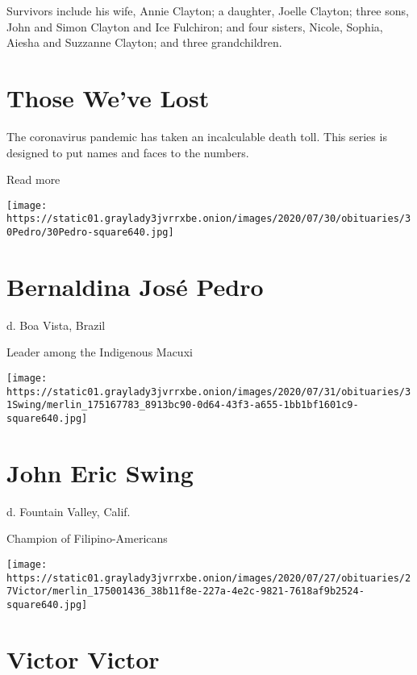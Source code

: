 Survivors include his wife, Annie Clayton; a daughter, Joelle Clayton;
three sons, John and Simon Clayton and Ice Fulchiron; and four sisters,
Nicole, Sophia, Aiesha and Suzzanne Clayton; and three grandchildren.

\href{https://www.nytimes3xbfgragh.onion/interactive/2020/obituaries/people-died-coronavirus-obituaries.html?action=click\&pgtype=Article\&state=default\&region=BELOW_MAIN_CONTENT\&context=covid_obits_promo}{}

\hypertarget{those-weve-lost}{%
\section{Those We've Lost}\label{those-weve-lost}}

The coronavirus pandemic has taken an incalculable death toll. This
series is designed to put names and faces to the numbers.

Read more

\texttt{[image: https://static01.graylady3jvrrxbe.onion/images/2020/07/30/obituaries/30Pedro/30Pedro-square640.jpg]}

\hypertarget{bernaldina-josuxe9-pedro}{%
\section{Bernaldina José Pedro}\label{bernaldina-josuxe9-pedro}}

d. Boa Vista, Brazil

Leader among the Indigenous Macuxi

\texttt{[image: https://static01.graylady3jvrrxbe.onion/images/2020/07/31/obituaries/31Swing/merlin\_175167783\_8913bc90-0d64-43f3-a655-1bb1bf1601c9-square640.jpg]}

\hypertarget{john-eric-swing}{%
\section{John Eric Swing}\label{john-eric-swing}}

d. Fountain Valley, Calif.

Champion of Filipino-Americans

\texttt{[image: https://static01.graylady3jvrrxbe.onion/images/2020/07/27/obituaries/27Victor/merlin\_175001436\_38b11f8e-227a-4e2c-9821-7618af9b2524-square640.jpg]}

\hypertarget{victor-victor}{%
\section{Victor Victor}\label{victor-victor}}

